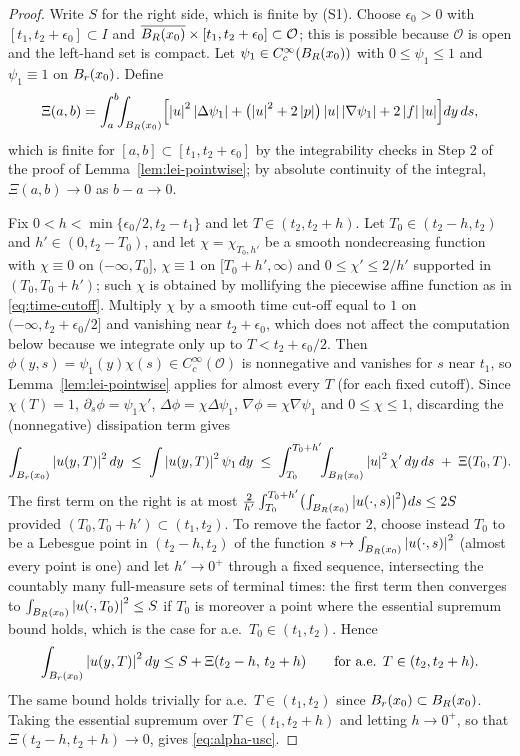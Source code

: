 \documentclass[11pt,reqno]{amsart}
\begin{document}
\begin{proof}
Write $S$ for the right side, which is finite by (S1). Choose
$\epsilon_{0}>0$ with $[t_{1},t_{2}+\epsilon_{0}]\subset I$ and
$\overline{B_{R}(x_{0})}\times[t_{1},t_{2}+\epsilon_{0}]\subset\mathcal{O}$;
this is possible because $\mathcal{O}$ is open and the left-hand set is compact.
Let $\psi_{1}\in C_{c}^{\infty}(B_{R}(x_{0}))$ with $0\le\psi_{1}\le1$ and
$\psi_{1}\equiv1$ on $B_{r}(x_{0})$. Define
\[
  \Xi(a,b)=\int_{a}^{b}\!\!\int_{B_{R}(x_{0})}
   \Bigl[\left\lvert u \right\rvert^{2}\left\lvert \Delta\psi_{1} \right\rvert
    +\bigl(\left\lvert u \right\rvert^{2}+2\left\lvert p \right\rvert\bigr)\left\lvert u \right\rvert\left\lvert \nabla\psi_{1} \right\rvert
    +2\left\lvert f \right\rvert\left\lvert u \right\rvert\Bigr]dy\,ds ,
\]
which is finite for $[a,b]\subset[t_{1},t_{2}+\epsilon_{0}]$ by the
integrability checks in Step 2 of the proof of Lemma~\ref{lem:lei-pointwise};
by absolute continuity of the integral, $\Xi(a,b)\to0$ as $b-a\to0$.

Fix $0<h<\min\{\epsilon_{0}/2,t_2-t_1\}$ and let $T\in(t_{2},t_{2}+h)$. Let
$T_{0}\in(t_{2}-h,t_{2})$ and $h'\in(0,t_{2}-T_{0})$, and let
$\chi=\chi_{T_{0},h'}$ be a smooth nondecreasing function with $\chi\equiv0$ on
$(-\infty,T_{0}]$, $\chi\equiv1$ on $[T_{0}+h',\infty)$ and
$0\le\chi'\le2/h'$ supported in $(T_{0},T_{0}+h')$; such $\chi$ is obtained by
mollifying the piecewise affine function as in \eqref{eq:time-cutoff}. Multiply
$\chi$ by a smooth time cut-off equal to $1$ on
$(-\infty,t_{2}+\epsilon_{0}/2]$ and vanishing near $t_{2}+\epsilon_{0}$, which
does not affect the computation below because we integrate only up to
$T<t_{2}+\epsilon_{0}/2$. Then
$\phi(y,s)=\psi_{1}(y)\chi(s)\in C_{c}^{\infty}(\mathcal{O})$ is nonnegative and
vanishes for $s$ near $t_{1}$, so Lemma~\ref{lem:lei-pointwise} applies for almost every
$T$ (for each fixed cutoff). Since $\chi(T)=1$, $\partial_{s}\phi=\psi_{1}\chi'$,
$\Delta\phi=\chi\Delta\psi_{1}$, $\nabla\phi=\chi\nabla\psi_{1}$ and
$0\le\chi\le1$, discarding the (nonnegative) dissipation term gives
\[
  \int_{B_{r}(x_{0})}\left\lvert u(y,T) \right\rvert^{2}dy
  \;\le\;\int\left\lvert u(y,T) \right\rvert^{2}\psi_{1}\,dy
  \;\le\;\int_{T_{0}}^{T_{0}+h'}\!\!\int_{B_{R}(x_{0})}\left\lvert u \right\rvert^{2}\chi'\,dy\,ds
   \;+\;\Xi(T_{0},T).
\]
The first term on the right is at most
$\frac{2}{h'}\int_{T_{0}}^{T_{0}+h'}\bigl(\int_{B_{R}(x_{0})}\left\lvert u(\cdot,s) \right\rvert^{2}\bigr)ds
 \le2S$ provided $(T_{0},T_{0}+h')\subset(t_{1},t_{2})$. To remove the factor
$2$, choose instead $T_{0}$ to be a Lebesgue point in $(t_{2}-h,t_{2})$ of the
function $s\mapsto\int_{B_{R}(x_{0})}\left\lvert u(\cdot,s) \right\rvert^{2}$ (almost every
point is one) and let $h'\to0^{+}$ through a fixed sequence, intersecting the countably
many full-measure sets of terminal times: the first term then converges to
$\int_{B_{R}(x_{0})}\left\lvert u(\cdot,T_{0}) \right\rvert^{2}\le S$ if $T_{0}$ is moreover a
point where the essential supremum bound holds, which is the case for a.e.\
$T_{0}\in(t_{1},t_{2})$. Hence
\[
  \int_{B_{r}(x_{0})}\left\lvert u(y,T) \right\rvert^{2}dy\le S+\Xi(t_{2}-h,\,t_{2}+h)
  \qquad\text{for a.e. }T\in(t_{2},t_{2}+h).
\]
The same bound holds trivially for a.e.\ $T\in(t_{1},t_{2})$ since
$B_{r}(x_{0})\subset B_{R}(x_{0})$. Taking the essential supremum over
$T\in(t_{1},t_{2}+h)$ and letting $h\to0^{+}$, so that
$\Xi(t_{2}-h,t_{2}+h)\to0$, gives \eqref{eq:alpha-usc}.
\end{proof}
\end{document}
